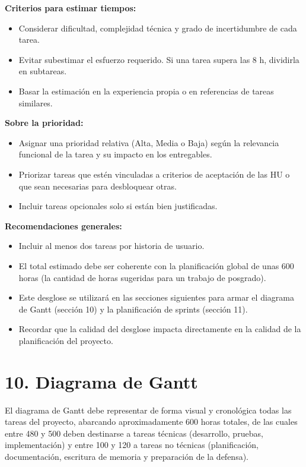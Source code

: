 \documentclass[
11pt, %
]{charter}
\begin{document}
\textbf{Criterios para estimar tiempos:}
\begin{itemize}
  \item Considerar dificultad, complejidad técnica y grado de incertidumbre de cada tarea.
  \item Evitar subestimar el esfuerzo requerido. Si una tarea supera las 8 h, dividirla en subtareas.
  \item Basar la estimación en la experiencia propia o en referencias de tareas similares.
\end{itemize}

\textbf{Sobre la prioridad:}
\begin{itemize}
  \item Asignar una prioridad relativa (Alta, Media o Baja) según la relevancia funcional de la tarea y su impacto en los entregables.
  \item Priorizar tareas que estén vinculadas a criterios de aceptación de las HU o que sean necesarias para desbloquear otras.
  \item Incluir tareas opcionales solo si están bien justificadas.
\end{itemize}

\textbf{Recomendaciones generales:}
\begin{itemize}
  \item Incluir al menos dos tareas por historia de usuario.
  \item El total estimado debe ser coherente con la planificación global de unas 600 horas (la cantidad de horas sugeridas para un trabajo de posgrado).
  \item Este desglose se utilizará en las secciones siguientes para armar el diagrama de Gantt (sección 10) y la planificación de sprints (sección 11).
  \item Recordar que la calidad del desglose impacta directamente en la calidad de la planificación del proyecto.
\end{itemize}


\section{10. Diagrama de Gantt}
\label{sec:gantt}

El diagrama de Gantt debe representar de forma visual y cronológica todas las tareas del proyecto, abarcando aproximadamente 600 horas totales, de las cuales entre 480 y 500 deben destinarse a tareas técnicas (desarrollo, pruebas, implementación) y entre 100 y 120 a tareas no técnicas (planificación, documentación, escritura de memoria y preparación de la defensa).
\end{document}
